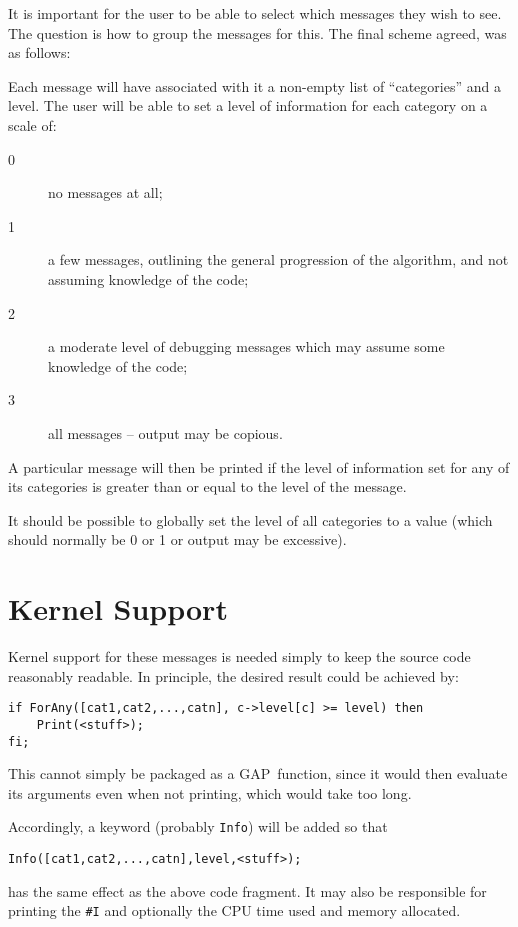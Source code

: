 \documentclass{article}
\def\GAP{\textsf{GAP}}
\let\code\texttt
\begin{document}
It is important for the user to be able to select which messages they
wish to see. The question is how to group the messages for this. The
final scheme agreed, was as follows:

Each message will have associated with it a non-empty list of
``categories'' and a level. The user will be able to set a level of
information for each category on a scale of:

\begin{description}
\item[0] no messages at all;
\item[1] a few messages, outlining the general progression of the
algorithm, and not assuming knowledge of the code;
\item[2] a moderate level of debugging messages which may assume some
knowledge of the code;
\item[3] all messages -- output may be copious.
\end{description}

A particular message will then be printed if the level of information
set for any of its categories is greater than or equal to the level of
the message.

It should be possible to globally set the level of all categories to a
value (which should normally be 0 or 1 or output may be excessive).

\section{Kernel Support}

Kernel support for these messages is needed simply to keep the source
code reasonably readable. In principle, the desired result could be
achieved by:

\begin{verbatim}
if ForAny([cat1,cat2,...,catn], c->level[c] >= level) then
	Print(<stuff>);
fi;
\end{verbatim}

This cannot simply be packaged as a \GAP\ function, since it would
then evaluate its arguments even when not printing, which would take
too long.

Accordingly, a keyword (probably \code{Info}) will be added so that

\begin{verbatim}
Info([cat1,cat2,...,catn],level,<stuff>);
\end{verbatim}

has the same effect as the above code fragment. It may also be
responsible for printing the \code{\#I} and optionally the CPU time
used and memory allocated.
\end{document}
